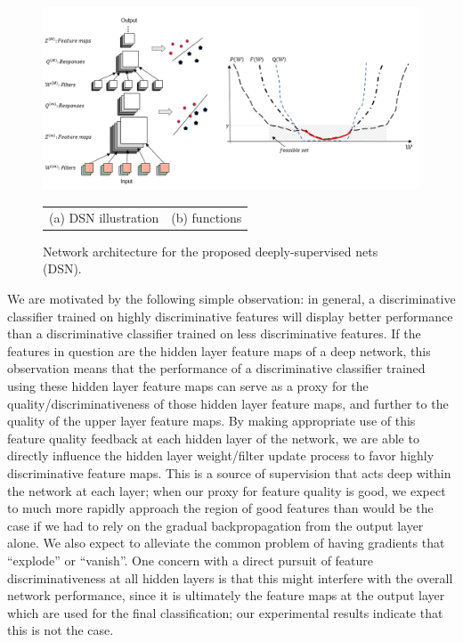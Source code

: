\documentclass{article} %
\begin{document}
\begin{figure}[t]
\begin{center}
\includegraphics[width=0.8\linewidth]{architecture.png}
\begin{tabular}{ll}
(a) DSN illustration  & \hspace{4cm} (b) functions\\
\end{tabular}
\end{center}
\caption{Network architecture for the proposed deeply-supervised nets (DSN).}
\label{fig:architecture}
\vspace{-5mm}
\end{figure}

We are motivated by the following simple observation: in general, a discriminative classifier trained on highly discriminative features will display better performance than a discriminative classifier trained on less discriminative features. If the features in question are the hidden layer feature maps of a deep network, this observation means that the performance of a discriminative classifier trained using these hidden layer feature maps can serve as a proxy for the quality/discriminativeness of those hidden layer feature maps, and further to the quality of the upper layer feature maps.
By making appropriate use of this feature quality feedback at each hidden layer of the network, we are able to directly influence the hidden layer weight/filter update process to favor highly discriminative feature maps. This is a source of supervision that acts deep within the network at each layer; when our proxy for feature quality is good, we expect to much more rapidly approach the region of good features than would be the case if we had to rely on the gradual backpropagation from the output layer alone.
We also expect to alleviate the common problem of having gradients that ``explode'' or ``vanish''.
One concern with a direct pursuit of feature discriminativeness at all hidden layers is that this might interfere with the overall network performance, since it is ultimately the feature maps at the output layer which are used for the final classification; our experimental results indicate that this is not the case.
\end{document}
